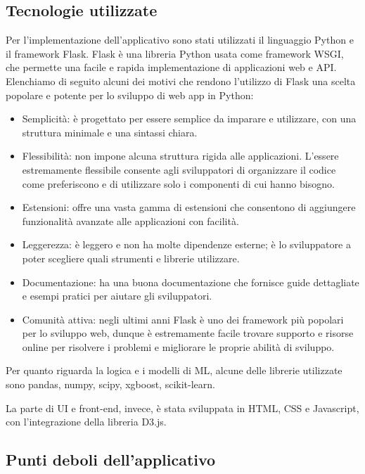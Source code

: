 \subsection{Tecnologie utilizzate}
\label{subsec:tecnologie}

Per l’implementazione dell'applicativo sono stati utilizzati il linguaggio Python e il framework Flask.
\newline
Flask è una libreria Python usata come framework WSGI, che permette una facile e rapida implementazione di applicazioni web e API. 
\newline
Elenchiamo di seguito alcuni dei motivi che rendono l’utilizzo di Flask una scelta popolare e potente per lo sviluppo di web app in Python:
\begin{itemize}
    \item Semplicità:  è progettato per essere semplice da imparare e utilizzare, con una struttura minimale e una sintassi chiara.
    \item Flessibilità: non impone alcuna struttura rigida alle applicazioni. L’essere estremamente  flessibile consente agli sviluppatori di organizzare il codice come preferiscono e di utilizzare solo i componenti di cui hanno bisogno.
    \item Estensioni: offre una vasta gamma di estensioni che consentono di aggiungere funzionalità avanzate alle applicazioni con facilità.
    \item Leggerezza:  è leggero e non ha molte dipendenze esterne; è lo sviluppatore a poter scegliere quali strumenti e librerie utilizzare.
    \item Documentazione: ha una buona documentazione che fornisce guide dettagliate e esempi pratici per aiutare gli sviluppatori.
    \item Comunità attiva: negli ultimi anni Flask è uno dei framework più popolari per lo sviluppo web, dunque è estremamente facile trovare supporto e risorse online per risolvere i problemi e migliorare le proprie abilità di sviluppo.
\end{itemize}

Per quanto riguarda la logica e i modelli di ML, alcune delle librerie utilizzate sono pandas, numpy, scipy, xgboost, scikit-learn.

La parte di UI e front-end, invece, è stata sviluppata in HTML, CSS e Javascript, con l'integrazione della libreria D3.js.

\subsection{Punti deboli dell'applicativo}
\label{subsec:puntiDeboli}

